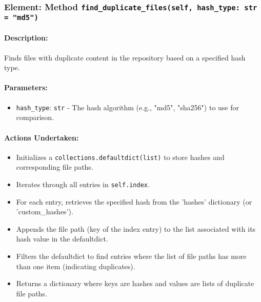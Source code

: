 \documentclass{article}
\begin{document}
\subsubsection{Element: Method \texttt{find\_duplicate\_files(self, hash\_type: str = "md5")}}
\paragraph{Description:} Finds files with duplicate content in the repository based on a specified hash type.
\paragraph{Parameters:}
\begin{itemize}
    \item \texttt{hash\_type}: \texttt{str} - The hash algorithm (e.g., "md5", "sha256") to use for comparison.
\end{itemize}
\paragraph{Actions Undertaken:}
\begin{itemize}
    \item Initializes a \texttt{collections.defaultdict(list)} to store hashes and corresponding file paths.
    \item Iterates through all entries in \texttt{self.index}.
    \item For each entry, retrieves the specified hash from the 'hashes' dictionary (or 'custom\_hashes').
    \item Appends the file path (key of the index entry) to the list associated with its hash value in the defaultdict.
    \item Filters the defaultdict to find entries where the list of file paths has more than one item (indicating duplicates).
    \item Returns a dictionary where keys are hashes and values are lists of duplicate file paths.
\end{itemize}
\end{document}
